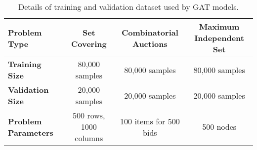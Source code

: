 \begin{table*}[htb!]
    \centering
    \begin{tabular}{|l c c c|}
        \hline
        \textbf{Problem Type} & \textbf{Set Covering} & \textbf{Combinatorial Auctions} & \textbf{Maximum Independent Set}\\
        \hline
        \textbf{Training Size} & 80,000 samples & 80,000 samples & 80,000 samples\\
        \textbf{Validation Size} & 20,000 samples & 20,000 samples & 20,000 samples\\
        \textbf{Problem Parameters} & 500 rows, 1000 columns & 100 items for 500 bids & 500 nodes\\
        \hline
    \end{tabular}
    \caption{Details of training and validation dataset used by GAT models.}
    \label{tab:gat-training-data}
\end{table*}